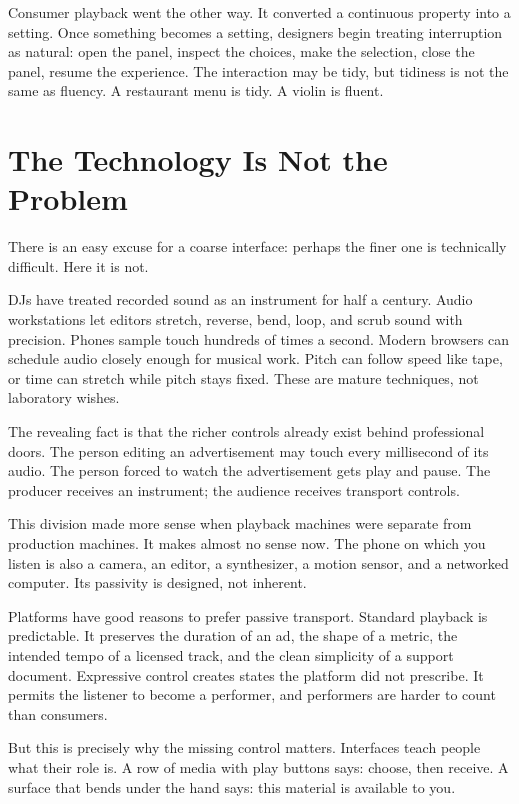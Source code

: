 \documentclass[11pt,letterpaper]{article}
\begin{document}
Consumer playback went the other way. It converted a continuous property into a setting. Once something becomes a setting, designers begin treating interruption as natural: open the panel, inspect the choices, make the selection, close the panel, resume the experience. The interaction may be tidy, but tidiness is not the same as fluency. A restaurant menu is tidy. A violin is fluent.

\section{The Technology Is Not the Problem}

There is an easy excuse for a coarse interface: perhaps the finer one is technically difficult. Here it is not.

DJs have treated recorded sound as an instrument for half a century. Audio workstations let editors stretch, reverse, bend, loop, and scrub sound with precision. Phones sample touch hundreds of times a second. Modern browsers can schedule audio closely enough for musical work. Pitch can follow speed like tape, or time can stretch while pitch stays fixed. These are mature techniques, not laboratory wishes.

The revealing fact is that the richer controls already exist behind professional doors. The person editing an advertisement may touch every millisecond of its audio. The person forced to watch the advertisement gets play and pause. The producer receives an instrument; the audience receives transport controls.

This division made more sense when playback machines were separate from production machines. It makes almost no sense now. The phone on which you listen is also a camera, an editor, a synthesizer, a motion sensor, and a networked computer. Its passivity is designed, not inherent.

Platforms have good reasons to prefer passive transport. Standard playback is predictable. It preserves the duration of an ad, the shape of a metric, the intended tempo of a licensed track, and the clean simplicity of a support document. Expressive control creates states the platform did not prescribe. It permits the listener to become a performer, and performers are harder to count than consumers.

But this is precisely why the missing control matters. Interfaces teach people what their role is. A row of media with play buttons says: choose, then receive. A surface that bends under the hand says: this material is available to you.
\end{document}
